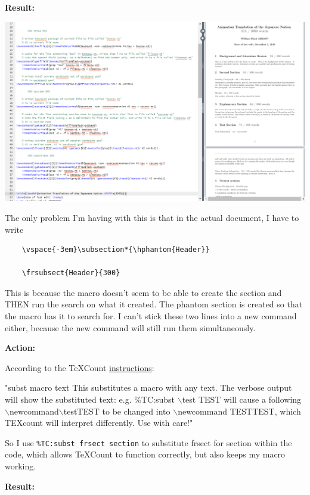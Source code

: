 \documentclass[12pt]{article}
\begin{document}
\textbf{Result:}

\includegraphics[width=\textwidth]{imgelaborationfullcountsubcount.PNG}

The only problem I'm having with this is that in the actual document, I have to write 
\begin{verbatim}
    \vspace{-3em}\subsection*{\hphantom{Header}}

    \frsubsect{Header}{300}
\end{verbatim}
This is because the macro doesn't seem to be able to create the section and THEN run the search on what it created. The phantom section is created so that the macro has it to search for. I can't stick these two lines into a new command either, because the new command will still run them simultaneously.

\textbf{Action:}

According to the TeXCount \href{https://app.uio.no/ifi/texcount/download.php?doc=TeXcount_3_1_1.pdf}{instructions}: 

"subst macro text This substitutes a macro with any text. The verbose output will show the substituted text: e.g. \%TC:subst $\backslash$test TEST will cause a following $\backslash$newcommand$\backslash$test{TEST} to be changed into $\backslash$newcommand TEST{TEST}, which TEXcount will interpret differently. Use with care!"

So I use \texttt{\%TC:subst frsect section} to substitute frsect for section within the code, which allows TeXCount to function correctly, but also keeps my macro working.

\textbf{Result:}
\end{document}
